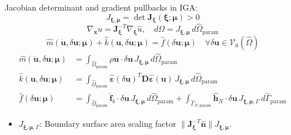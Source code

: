 \documentclass[12pt,a4paper,oneside]{report}
\newcommand{\vect}[1]{\mathbf{#1}}
\newcommand{\mat}[1]{\mathbf{#1}}
\begin{document}
Jacobian determinant and gradient pullbacks in IGA:
\begin{equation}
    J_{\boldsymbol{\xi}, \boldsymbol{\mu}} = \det \mathbf{J}_{\boldsymbol{\xi}}(\boldsymbol{\xi}; \boldsymbol{\mu}) > 0
\end{equation}
\begin{equation}
    \nabla_{\boldsymbol{x}} u = \mathbf{J}_{\boldsymbol{\xi}}^{-T} \nabla_{\boldsymbol{\xi}} \hat{u}, \quad d\Omega = J_{\boldsymbol{\xi}, \boldsymbol{\mu}} \, d\hat{\Omega}_{\text{param}}
\end{equation}
\begin{equation}
    \hat{m}(\ddot{\vect{u}}, \delta\vect{u}; \boldsymbol{\mu}) + \hat{k}(\vect{u}, \delta\vect{u}; \boldsymbol{\mu}) = \hat{f}(\delta\vect{u}; \boldsymbol{\mu}) \quad \forall \delta\vect{u} \in \mathcal{V}_0(\hat{\Omega})
\end{equation}
\begin{align}
    \hat{m}(\ddot{\vect{u}}, \delta\vect{u}; \boldsymbol{\mu}) & = \int_{\hat{\Omega}_{\text{param}}} \rho \ddot{\vect{u}} \cdot \delta\vect{u} \, J_{\boldsymbol{\xi}, \boldsymbol{\mu}} \, d\hat{\Omega}_{\text{param}}                                                                                                                                        \\
    \hat{k}(\vect{u}, \delta\vect{u}; \boldsymbol{\mu})        & = \int_{\hat{\Omega}_{\text{param}}} \hat{\boldsymbol{\varepsilon}}(\delta\vect{u})^T \mat{D} \hat{\boldsymbol{\varepsilon}}(\vect{u}) \, J_{\boldsymbol{\xi}, \boldsymbol{\mu}} \, d\hat{\Omega}_{\text{param}}                                   \\
    \hat{f}(\delta\vect{u}; \boldsymbol{\mu})                  & = \int_{\hat{\Omega}_{\text{param}}} \vect{\hat{f}}_b \cdot \delta\vect{u} \, J_{\boldsymbol{\xi}, \boldsymbol{\mu}} \, d\hat{\Omega}_{\text{param}} + \int_{\hat{\Gamma}_{N,\text{param}}} \vect{\hat{h}}_N \cdot \delta\vect{u} \, J_{\boldsymbol{\xi}, \boldsymbol{\mu}, \Gamma} \, d\hat{\Gamma}_{\text{param}}
\end{align}
\begin{tcolorbox}[colback=gray!5!white,colframe=gray!60!black,title={Term Definitions \& Parameter Dependencies}]
\begin{itemize}
    \item $J_{\boldsymbol{\xi}, \boldsymbol{\mu}, \Gamma}$: Boundary surface area scaling factor $\|\mathbf{J}_{\boldsymbol{\xi}}^{-T} \hat{\vect{n}}\| J_{\boldsymbol{\xi}, \boldsymbol{\mu}}$.
\end{itemize}
\end{tcolorbox}
\end{document}
